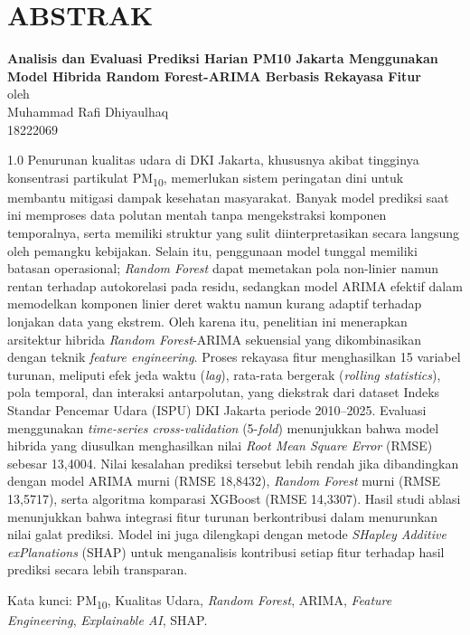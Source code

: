 \chapter*{ABSTRAK}

\begin{center}

    \textbf{Analisis dan Evaluasi Prediksi Harian PM10 Jakarta Menggunakan Model Hibrida Random Forest-ARIMA Berbasis Rekayasa Fitur} \\
    \vspace{0.4cm}
    oleh \\
    \vspace{0.4cm}
    Muhammad Rafi Dhiyaulhaq\\
    18222069\\
\end{center}

\begin{spacing}{1.0}
Penurunan kualitas udara di DKI Jakarta, khususnya akibat tingginya konsentrasi partikulat PM\textsubscript{10}, memerlukan sistem peringatan dini untuk membantu mitigasi dampak kesehatan masyarakat. Banyak model prediksi saat ini memproses data polutan mentah tanpa mengekstraksi komponen temporalnya, serta memiliki struktur yang sulit diinterpretasikan secara langsung oleh pemangku kebijakan. Selain itu, penggunaan model tunggal memiliki batasan operasional; \textit{Random Forest} dapat memetakan pola non-linier namun rentan terhadap autokorelasi pada residu, sedangkan model ARIMA efektif dalam memodelkan komponen linier deret waktu namun kurang adaptif terhadap lonjakan data yang ekstrem. Oleh karena itu, penelitian ini menerapkan arsitektur hibrida \textit{Random Forest}-ARIMA sekuensial yang dikombinasikan dengan teknik \textit{feature engineering}. Proses rekayasa fitur menghasilkan 15 variabel turunan, meliputi efek jeda waktu (\textit{lag}), rata-rata bergerak (\textit{rolling statistics}), pola temporal, dan interaksi antarpolutan, yang diekstrak dari dataset Indeks Standar Pencemar Udara (ISPU) DKI Jakarta periode 2010--2025. Evaluasi menggunakan \textit{time-series cross-validation} (5-\textit{fold}) menunjukkan bahwa model hibrida yang diusulkan menghasilkan nilai \textit{Root Mean Square Error} (RMSE) sebesar 13,4004. Nilai kesalahan prediksi tersebut lebih rendah jika dibandingkan dengan model ARIMA murni (RMSE 18,8432), \textit{Random Forest} murni (RMSE 13,5717), serta algoritma komparasi XGBoost (RMSE 14,3307). Hasil studi ablasi menunjukkan bahwa integrasi fitur turunan berkontribusi dalam menurunkan nilai galat prediksi. Model ini juga dilengkapi dengan metode \textit{SHapley Additive exPlanations} (SHAP) untuk menganalisis kontribusi setiap fitur terhadap hasil prediksi secara lebih transparan.

Kata kunci: PM\textsubscript{10}, Kualitas Udara, \textit{Random Forest}, ARIMA, \textit{Feature Engineering}, \textit{Explainable AI}, SHAP.
\end{spacing}